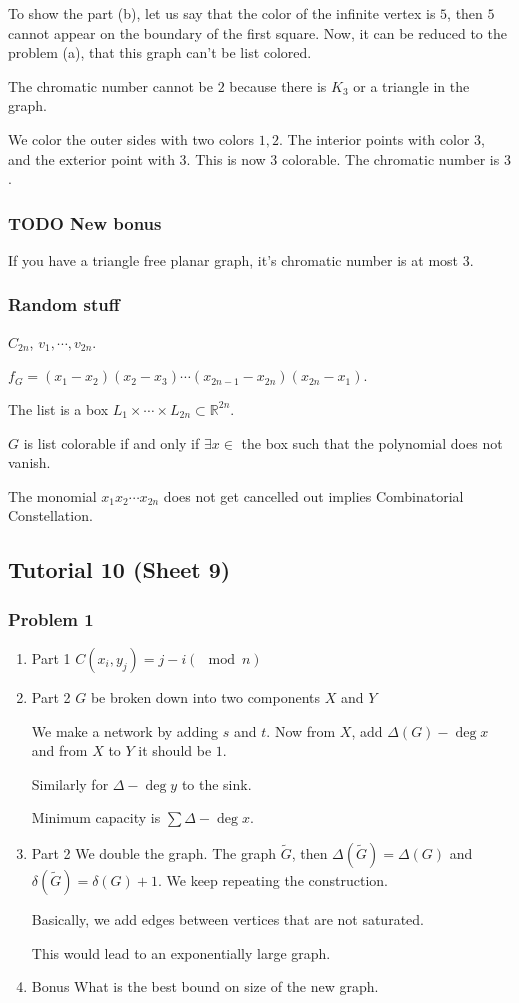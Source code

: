 \documentclass[11pt]{article}
\def\R{\mathbb{R}}
\begin{document}
To show the part (b), let us say that the color of the infinite vertex is
\(5\), then \(5\) cannot appear on the boundary of the first square. Now, it can
be reduced to the problem (a), that this graph can't be list colored.

The chromatic number cannot be \(2\) because there is \(K_3\) or a triangle in
the graph.

We color the outer sides with two colors \(1, 2\). The interior points with
color \(3\), and the exterior point with \(3\). This is now \(3\) colorable. The
chromatic number is \(3\).
\subsubsection{{\bfseries\sffamily TODO} New bonus}
\label{sec:orgc96b6ef}
If you have a triangle free planar graph, it's chromatic number is at most \(3\).
\subsubsection{Random stuff}
\label{sec:orga2ba08d}
\(C_{2n}\), \(v_1, \cdots, v_{2n}\).

\(f_G = (x_1 -x_2)(x_2 - x_3) \cdots (x_{2n-1} - x_{2n})(x_{2n} - x_1)\).

The list is a box \(L_1 \times \cdots \times L_{2n} \subset \R^{2n}\).

\(G\) is list colorable if and only if \(\exists x \in\) the box such that the
polynomial does not vanish.

The monomial \(x_1x_2\cdots x_{2n}\) does not get cancelled out implies
Combinatorial Constellation.
\subsection{Tutorial 10 (Sheet 9)}
\label{sec:org9bdd1bb}
\subsubsection{Problem 1}
\label{sec:org3c1dc6c}
\begin{enumerate}
\item Part 1
\label{sec:org11f4946}
\(C(x_i, y_j) = j - i (\mod n)\)
\item Part 2
\label{sec:orgad53fb0}
\(G\) be broken down into two components \(X\) and \(Y\)

We make a network by adding \(s\) and \(t\). Now from \(X\), add \(\Delta(G) -
     \deg x\) and from \(X\) to \(Y\) it should be \(1\).

Similarly for \(\Delta - \deg y\) to the sink.

Minimum capacity is \(\sum \Delta - \deg x\).
\item Part 2
\label{sec:org6a70f9f}
We double the graph. The graph \(\tilde{G}\), then \(\Delta(\tilde G) =
     \Delta(G)\) and \(\delta(\tilde{G}) = \delta(G) + 1\). We keep repeating the
construction.

Basically, we add edges between vertices that are not saturated.

This would lead to an exponentially large graph.
\item Bonus
\label{sec:org8d08830}
What is the best bound on size of the new graph.
\end{enumerate}
\end{document}
